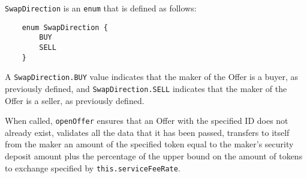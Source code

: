 \documentclass[11pt]{article}
\begin{document}
    \verb|SwapDirection| is an \verb|enum| that is defined as follows:
    \begin{verbatim}
    enum SwapDirection {
        BUY
        SELL
    }
    \end{verbatim}
    A \verb|SwapDirection.BUY| value indicates that the maker of the Offer is a buyer, as previously
    defined, and \verb|SwapDirection.SELL| indicates that the maker of the Offer is a seller, as
    previously defined.

    When called, \verb|openOffer| ensures that an Offer with the specified ID does not already
    exist, validates all the data that it has been passed, transfers to itself from the maker an
    amount of the specified token equal to the maker's security deposit amount plus the percentage
    of the upper bound on the amount of tokens to exchange specified by \verb|this.serviceFeeRate|.
\end{document}
